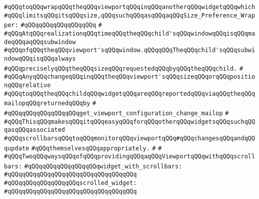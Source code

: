 \verb|#qQQqtoqQQqwrapqQQqtheqQQqviewportqQQqinqQQqanotherqQQqwidgetqQQqwhich|\newline
\verb|#qQQqlimitsqQQqitsqQQqsize,qQQqsuchqQQqasqQQqaqQQqSize_Preference_Wrapper:|\newline
\verb|#qQQqqQQqqQQqqQQqqQQq|\newline
\verb|#|\newline
\verb|#qQQqAtqQQqrealizationqQQqtimeqQQqtheqQQqchild'sqQQqwindowqQQqisqQQqmadeqQQqaqQQqsubwindow|\newline
\verb|#qQQqofqQQqtheqQQqviewport'sqQQqwindow.qQQqqQQqTheqQQqchild'sqQQqsubwindowqQQqisqQQqalways|\newline
\verb|#qQQqpreciselyqQQqtheqQQqsizeqQQqrequestedqQQqbyqQQqtheqQQqchild.|\newline
\verb|#|\newline
\verb|#qQQqAnyqQQqchangeqQQqinqQQqtheqQQqviewport'sqQQqsizeqQQqorqQQqpositionqQQqrelative|\newline
\verb|#qQQqtoqQQqtheqQQqchildqQQqwidgetqQQqareqQQqreportedqQQqviaqQQqtheqQQqmailopqQQqreturnedqQQqby|\newline
\verb|#|\newline
\verb|#qQQqqQQqqQQqqQQqqQQqget_viewport_configuration_change_mailop|\newline
\verb|#|\newline
\verb|#qQQqThisqQQqmakesqQQqitqQQqeasyqQQqforqQQqotherqQQqwidgetsqQQqsuchqQQqasqQQqassociated|\newline
\verb|#qQQqscrollbarsqQQqtoqQQqmonitorqQQqviewportqQQq#qQQqchangesqQQqandqQQqupdate|\newline
\verb|#qQQqthemselvesqQQqappropriately.|\newline
\verb|#|\newline
\verb|#|\newline
\verb|#qQQqTwoqQQqwaysqQQqofqQQqprovidingqQQqaqQQqViewportqQQqwithqQQqscrollbars:|\newline
\verb|#qQQqqQQqqQQqqQQqqQQqwidget_with_scrollbars:|\newline
\verb|#qQQqqQQqqQQqqQQqqQQqqQQqqQQqqQQqqQQq|\newline
\verb|#qQQqqQQqqQQqqQQqqQQqscrolled_widget:|\newline
\verb|#qQQqqQQqqQQqqQQqqQQqqQQqqQQqqQQqqQQq|\newline
